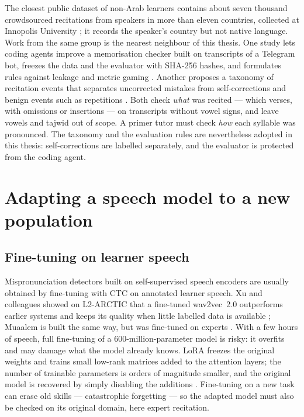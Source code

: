 The closest public dataset of non-Arab learners contains about seven thousand crowdsourced recitations from
speakers in more than eleven countries, collected at Innopolis University \cite{SRC-032}; it records
the speaker's country but not native language. Work from the same group is the nearest neighbour of this thesis. One study
lets coding agents improve a memorisation checker built on transcripts of a Telegram bot, freezes the data
and the evaluator with SHA-256 hashes, and formulates rules against leakage and metric gaming
\cite{SRC-067,SRC-069}. Another proposes a taxonomy of recitation events that separates uncorrected mistakes
from self-corrections and benign events such as repetitions \cite{SRC-068}. Both check \emph{what} was
recited --- which verses, with omissions or insertions --- on transcripts without vowel signs, and leave
vowels and tajwid out of scope. A primer tutor must check \emph{how} each syllable was pronounced. The
taxonomy and the evaluation rules are nevertheless adopted in this thesis: self-corrections are labelled
separately, and the evaluator is protected from the coding agent.

\section{Adapting a speech model to a new population}\label{sec:lr-adapt}

\subsection{Fine-tuning on learner speech}

Mispronunciation detectors built on self-supervised speech encoders are usually obtained by fine-tuning
with CTC on annotated learner speech. Xu and colleagues showed on L2-ARCTIC that a fine-tuned wav2vec~2.0
outperforms earlier systems and keeps its quality when little labelled data is available
\cite{SRC-116}; Muaalem is built the same way, but was fine-tuned on experts \cite{SRC-002}. With a few
hours of speech, full fine-tuning of a 600-million-parameter model is risky: it overfits and may damage
what the model already knows. LoRA freezes the original weights and trains small low-rank matrices
added to the attention layers; the number of trainable parameters is orders of magnitude smaller, and
the original model is recovered by simply disabling the additions \cite{SRC-111}. Fine-tuning on a new
task can erase old skills --- catastrophic forgetting \cite{SRC-118} --- so the adapted model must also be
checked on its original domain, here expert recitation.

